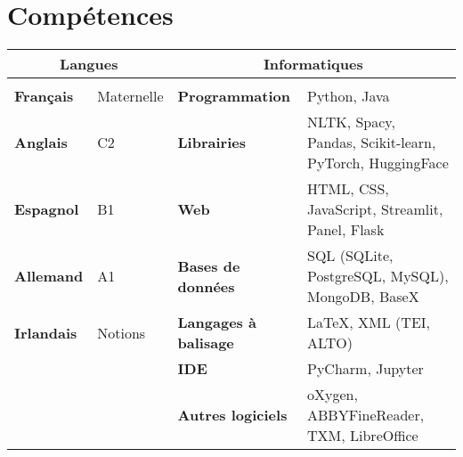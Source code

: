 \documentclass[11pt,a4paper,sans]{moderncv} %
\begin{document}
\section{Compétences}
    \small
    \setlength{\tabcolsep}{5pt}
    \begin{tabular}{ll|ll}
    \multicolumn{2}{c}{\textbf{Langues}}   & \multicolumn{2}{c}{\textbf{Informatiques}}                                             \\
    \hline \\
    \textbf{Français}  & Maternelle & \textbf{Programmation}       & Python, Java                                            \\
    \textbf{Anglais}   & C2                & \textbf{Librairies}          & NLTK, Spacy, Pandas, Scikit-learn, PyTorch, HuggingFace \\
    \textbf{Espagnol}  & B1                & \textbf{Web}                 & HTML, CSS, JavaScript, Streamlit, Panel, Flask          \\
    \textbf{Allemand}  & A1                & \textbf{Bases de données}    & SQL (SQLite, PostgreSQL, MySQL), MongoDB, BaseX         \\
    \textbf{Irlandais} & Notions           & \textbf{Langages à balisage} & \LaTeX, XML (TEI, ALTO)                  \\
              &                   & \textbf{IDE}                 & PyCharm, Jupyter                                        \\
              &                   & \textbf{Autres logiciels}    & oXygen, ABBYFineReader, TXM, LibreOffice               
    \end{tabular}







\end{document}
